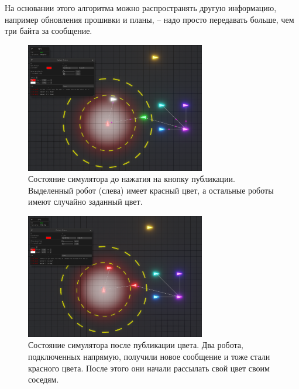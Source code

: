 \documentclass[%
]{report}
\begin{document}
На основании этого алгоритма можно распространять другую информацию, например обновления прошивки и планы, --
надо просто передавать больше, чем три байта за сообщение.

\begin{figure}[p]
  \centering
  \includegraphics[width = 0.7\textwidth]{colors-1.png}
  \caption{Состояние симулятора до нажатия на кнопку публикации. Выделенный робот (слева)
  имеет красный цвет, а остальные роботы имеют случайно заданный цвет.}
  \label{wave1}
\end{figure}

\begin{figure}[p]
  \centering
  \includegraphics[width = 0.7\textwidth]{colors-2.png}
  \caption{Состояние симулятора после публикации цвета. Два робота, подключенных напрямую,
  получили новое сообщение и тоже стали красного цвета. После этого они начали рассылать свой цвет своим соседям.}
  \label{wave2}
\end{figure}
\end{document}
